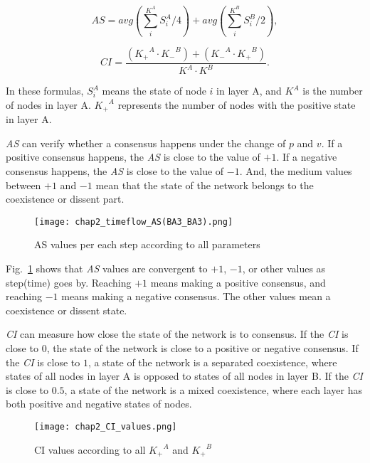\begin{equation}
AS = avg\left( {\sum\limits_i^{{K^A}} {S_i^A/4} } \right) + avg\left( {\sum\limits_i^{{K^B}} {S_i^B/2} } \right),
\end{equation}

\begin{equation}
CI = \frac{{({K_ + }^A \cdot {K_ - }^B) + ({K_ - }^A \cdot {K_ + }^B)}}{{{K^A} \cdot {K^B}}}.
\end{equation}

In these formulas, $S_i^A$ means the state of node $i$ in layer A, and $K^A$ is the number of nodes in layer A. ${K_ + }^A$ represents the number of nodes with the positive state in layer A.   

\textit{AS} can verify whether a consensus happens under the change of $p$ and $v$.  If a positive consensus happens, the \textit{AS} is close to the value of $+1$. If a negative consensus happens, the \textit{AS} is close to the value of $-1$. And, the medium values between $+1$ and $-1$ mean that the state of the network belongs to the coexistence or dissent part.

\begin{figure}[!htb]
	\centering
	\texttt{[image: chap2\_timeflow\_AS(BA3\_BA3).png]}
	\caption{AS values per each step according to all parameters}
	\label{chap2_timeflow_AS(BA3_BA3)}
\end{figure}

Fig.~\ref{chap2_timeflow_AS(BA3_BA3)} shows that \textit{AS} values are convergent to $+1$, $-1$, or other values as step(time) goes by. Reaching $+1$ means making a positive consensus, and reaching $-1$ means making a negative consensus. The other values mean a coexistence or dissent state. 

\textit{CI} can measure how close the state of the network is to consensus. If the \textit{CI} is close to $0$, the state of the network is close to a positive or negative consensus. If the \textit{CI} is close to $1$, a state of the network is a separated coexistence, where states of all nodes in layer A is opposed to states of all nodes in layer B. If the \textit{CI} is close to $0.5$, a state of the network is a mixed coexistence, where each layer has both positive and negative states of nodes.

\begin{figure}[!htb]
	\centering
	\texttt{[image: chap2\_CI\_values.png]}
	\caption{CI values according to all ${K_ + }^A$ and ${K_ + }^B$  }
	\label{chap2_CI_values}
\end{figure}

